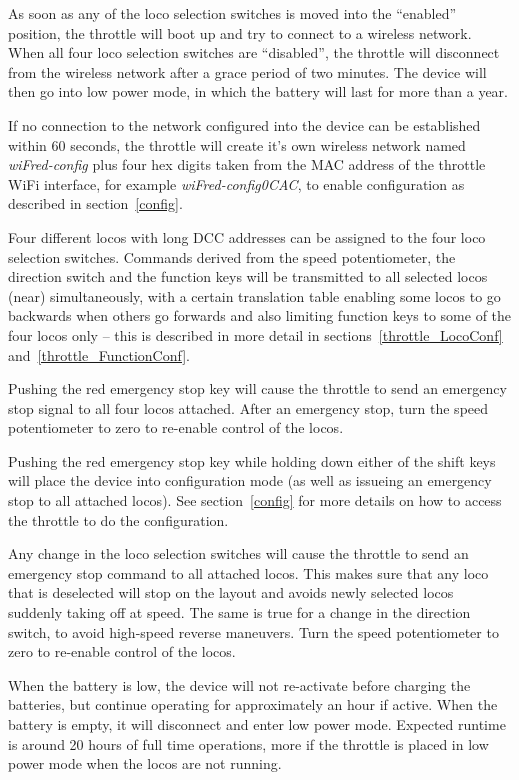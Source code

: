 \documentclass[11pt,a4paper]{scrartcl}
\begin{document}
As soon as any of the loco selection switches is moved into the ``enabled'' position, the throttle will boot up and try to connect to a wireless network. When all four loco selection switches are ``disabled'', the throttle will disconnect from the wireless network after a grace period of two minutes. The device will then go into low power mode, in which the battery will last for more than a year.

If no connection to the network configured into the device can be established within 60 seconds, the throttle will create it's own wireless network named \textit{wiFred-config} plus four hex digits taken from the MAC address of the throttle WiFi interface, for example \textit{wiFred-config0CAC}, to enable configuration as described in section~\ref{config}.

Four different locos with long DCC addresses can be assigned to the four loco selection switches. Commands derived from the speed potentiometer, the direction switch and the function keys will be transmitted to all selected locos (near) simultaneously, with a certain translation table enabling some locos to go backwards when others go forwards and also limiting function keys to some of the four locos only -- this is described in more detail in sections~\ref{throttle_LocoConf} and~\ref{throttle_FunctionConf}.

Pushing the red emergency stop key will cause the throttle to send an emergency stop signal to all four locos attached. After an emergency stop, turn the speed potentiometer to zero to re-enable control of the locos.

Pushing the red emergency stop key while holding down either of the shift keys will place the device into configuration mode (as well as issueing an emergency stop to all attached locos). See section~\ref{config} for more details on how to access the throttle to do the configuration.

Any change in the loco selection switches will cause the throttle to send an emergency stop command to all attached locos. This makes sure that any loco that is deselected will stop on the layout and avoids newly selected locos suddenly taking off at speed. The same is true for a change in the direction switch, to avoid high-speed reverse maneuvers. Turn the speed potentiometer to zero to re-enable control of the locos.

When the battery is low, the device will not re-activate before charging the batteries, but continue operating for approximately an hour if active. When the battery is empty, it will disconnect and enter low power mode. Expected runtime is around 20 hours of full time operations, more if the throttle is placed in low power mode when the locos are not running.
\end{document}
